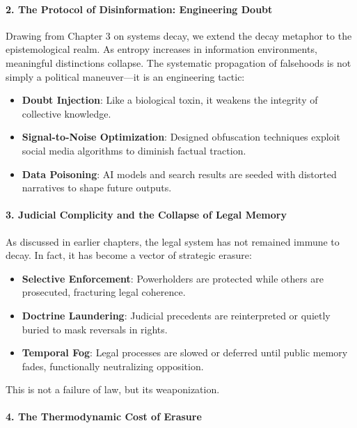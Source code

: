\paragraph{2. The Protocol of Disinformation: Engineering
Doubt}\label{the-protocol-of-disinformation-engineering-doubt}

Drawing from Chapter 3 on systems decay, we extend the decay metaphor to
the epistemological realm. As entropy increases in information
environments, meaningful distinctions collapse. The systematic
propagation of falsehoods is not simply a political maneuver---it is an
engineering tactic:

\begin{itemize}
\tightlist
\item
  \textbf{Doubt Injection}: Like a biological toxin, it weakens the
  integrity of collective knowledge.
\item
  \textbf{Signal-to-Noise Optimization}: Designed obfuscation techniques
  exploit social media algorithms to diminish factual traction.
\item
  \textbf{Data Poisoning}: AI models and search results are seeded with
  distorted narratives to shape future outputs.
\end{itemize}

\paragraph{3. Judicial Complicity and the Collapse of Legal
Memory}\label{judicial-complicity-and-the-collapse-of-legal-memory}

As discussed in earlier chapters, the legal system has not remained
immune to decay. In fact, it has become a vector of strategic erasure:

\begin{itemize}
\tightlist
\item
  \textbf{Selective Enforcement}: Powerholders are protected while
  others are prosecuted, fracturing legal coherence.
\item
  \textbf{Doctrine Laundering}: Judicial precedents are reinterpreted or
  quietly buried to mask reversals in rights.
\item
  \textbf{Temporal Fog}: Legal processes are slowed or deferred until
  public memory fades, functionally neutralizing opposition.
\end{itemize}

This is not a failure of law, but its weaponization.

\paragraph{4. The Thermodynamic Cost of
Erasure}\label{the-thermodynamic-cost-of-erasure}

